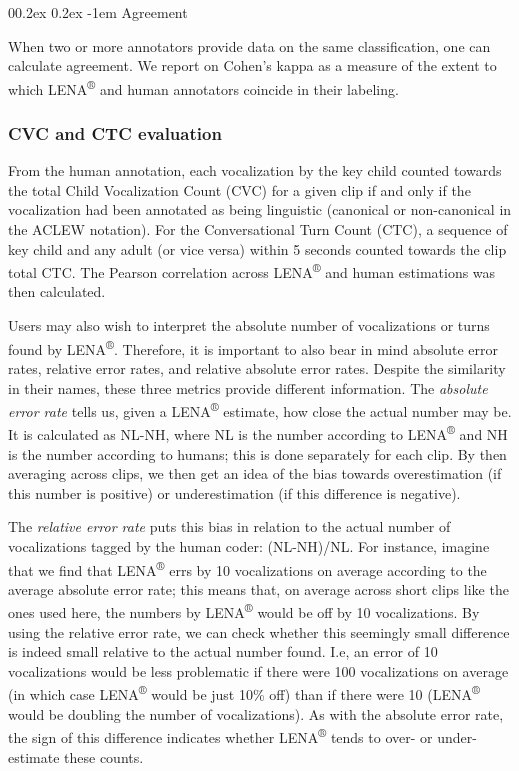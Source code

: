 \documentclass[english,table,man,floatsintext]{apa6}
\makeatletter
\let\oldparagraph\paragraph
\renewcommand{\paragraph}[1]{\oldparagraph{#1}\mbox{}}
\renewcommand{\paragraph}{\@startsection{paragraph}{4}{\parindent}%
  {0\baselineskip \@plus 0.2ex \@minus 0.2ex}%
  {-1em}%
  {\normalfont\normalsize\bfseries\itshape\typesectitle}}
\makeatother
\begin{document}
\hypertarget{agreement}{%
\paragraph{Agreement}\label{agreement}}

When two or more annotators provide data on the same classification, one can calculate agreement. We report on Cohen's kappa as a measure of the extent to which LENA\textsuperscript{®} and human annotators coincide in their labeling.

\hypertarget{cvc-and-ctc-evaluation}{%
\subsubsection{CVC and CTC evaluation}\label{cvc-and-ctc-evaluation}}

From the human annotation, each vocalization by the key child counted towards the total Child Vocalization Count (CVC) for a given clip if and only if the vocalization had been annotated as being linguistic (canonical or non-canonical in the ACLEW notation). For the Conversational Turn Count (CTC), a sequence of key child and any adult (or vice versa) within 5 seconds counted towards the clip total CTC. The Pearson correlation across LENA\textsuperscript{®} and human estimations was then calculated.

Users may also wish to interpret the absolute number of vocalizations or turns found by LENA\textsuperscript{®}. Therefore, it is important to also bear in mind absolute error rates, relative error rates, and relative absolute error rates. Despite the similarity in their names, these three metrics provide different information. The \emph{absolute error rate} tells us, given a LENA\textsuperscript{®} estimate, how close the actual number may be. It is calculated as NL-NH, where NL is the number according to LENA\textsuperscript{®} and NH is the number according to humans; this is done separately for each clip. By then averaging across clips, we then get an idea of the bias towards overestimation (if this number is positive) or underestimation (if this difference is negative).

The \emph{relative error rate} puts this bias in relation to the actual number of vocalizations tagged by the human coder: (NL-NH)/NL. For instance, imagine that we find that LENA\textsuperscript{®} errs by 10 vocalizations on average according to the average absolute error rate; this means that, on average across short clips like the ones used here, the numbers by LENA\textsuperscript{®} would be off by 10 vocalizations. By using the relative error rate, we can check whether this seemingly small difference is indeed small relative to the actual number found. I.e, an error of 10 vocalizations would be less problematic if there were 100 vocalizations on average (in which case LENA\textsuperscript{®} would be just 10\% off) than if there were 10 (LENA\textsuperscript{®} would be doubling the number of vocalizations). As with the absolute error rate, the sign of this difference indicates whether LENA\textsuperscript{®} tends to over- or under-estimate these counts.
\end{document}
